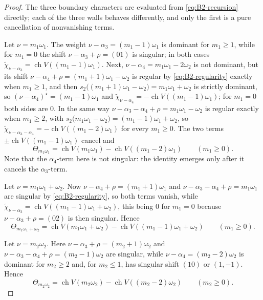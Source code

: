 \documentclass[11pt]{article}
\theoremstyle{definition}
\theoremstyle{remark}
\newcommand{\chr}{\operatorname{ch}}
\begin{document}
\begin{proof}
The three boundary characters are evaluated from \eqref{eq:B2-recursion}
directly; each of the three walls behaves differently, and only the first is a
pure cancellation of nonvanishing terms.

Let $\nu=m_1\omega_1$.  The weight
$\nu-\alpha_3=(m_1-1)\omega_1$ is dominant for $m_1\ge1$, while for $m_1=0$ the
shift $\nu-\alpha_3+\rho=(01)$ is singular; in both cases
$\widetilde\chi_{\nu-\alpha_3}=\chr V((m_1-1)\omega_1)$.  Next,
$\nu-\alpha_4=m_1\omega_1-2\omega_2$ is not dominant, but its shift
$\nu-\alpha_4+\rho=(m_1+1)\omega_1-\omega_2$ is regular by \eqref{eq:B2-regularity} exactly
when $m_1\ge1$, and then $s_2\bigl((m_1+1)\omega_1-\omega_2\bigr)=m_1\omega_1+\omega_2$ is strictly dominant, so
$(\nu-\alpha_4)^\star=(m_1-1)\omega_1$ and
$\widetilde\chi_{\nu-\alpha_4}=-\chr V((m_1-1)\omega_1)$; for $m_1=0$ both
sides are $0$.  In the same way $\nu-\alpha_3-\alpha_4+\rho=m_1\omega_1-\omega_2$ is
regular exactly when $m_1\ge2$, with $s_2\bigl(m_1\omega_1-\omega_2\bigr)=(m_1-1)\omega_1+\omega_2$, so
$\widetilde\chi_{\nu-\alpha_3-\alpha_4}=-\chr V((m_1-2)\omega_1)$ for every
$m_1\ge0$.  The two terms $\pm\chr V((m_1-1)\omega_1)$ cancel and
\begin{equation}\label{eq:B2-wall-1}
 \Theta_{m_1\omega_1}=\chr V(m_1\omega_1)-\chr V((m_1-2)\omega_1)
 \qquad(m_1\ge0).
\end{equation}
Note that the $\alpha_4$-term here is not singular: the identity emerges only
after it cancels the $\alpha_3$-term.

Let $\nu=m_1\omega_1+\omega_2$.  Now
$\nu-\alpha_4+\rho=(m_1+1)\omega_1$ and $\nu-\alpha_3-\alpha_4+\rho=m_1\omega_1$ are
singular by \eqref{eq:B2-regularity}, so both terms vanish, while
$\widetilde\chi_{\nu-\alpha_3}=\chr V((m_1-1)\omega_1+\omega_2)$, this being
$0$ for $m_1=0$ because $\nu-\alpha_3+\rho=(02)$ is then singular.  Hence
\begin{equation}\label{eq:B2-wall-2}
 \Theta_{m_1\omega_1+\omega_2}
  =\chr V(m_1\omega_1+\omega_2)-\chr V((m_1-1)\omega_1+\omega_2)
 \qquad(m_1\ge0).
\end{equation}

Let $\nu=m_2\omega_2$.  Here
$\nu-\alpha_3+\rho=(m_2+1)\omega_2$ and $\nu-\alpha_3-\alpha_4+\rho=(m_2-1)\omega_2$ are
singular, while $\nu-\alpha_4=(m_2-2)\omega_2$ is dominant for $m_2\ge2$ and, for
$m_2\le1$, has singular shift $(10)$ or $(1,-1)$.  Hence
\begin{equation}\label{eq:B2-wall-3}
 \Theta_{m_2\omega_2}=\chr V(m_2\omega_2)-\chr V((m_2-2)\omega_2)
 \qquad(m_2\ge0).
\end{equation}


\end{proof}
\end{document}

